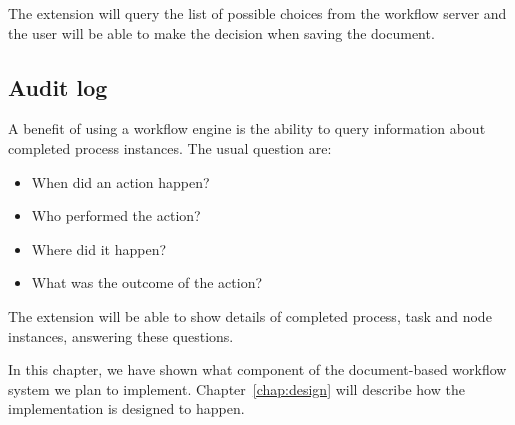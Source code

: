 The extension will query the list of possible choices from the workflow server
and the user will be able to make the decision when saving the document.

\subsection*{Audit log}

A benefit of using a workflow engine is the ability to query information about
completed process instances. The usual question are:

\begin{itemize}
\item When did an action happen?
\item Who performed the action?
\item Where did it happen?
\item What was the outcome of the action?
\end{itemize}

The extension will be able to show details of completed process, task and node
instances, answering these questions.

In this chapter, we have shown what component of the document-based workflow system we
plan to implement. Chapter~\ref{chap:design} will describe how the implementation
is designed to happen.
